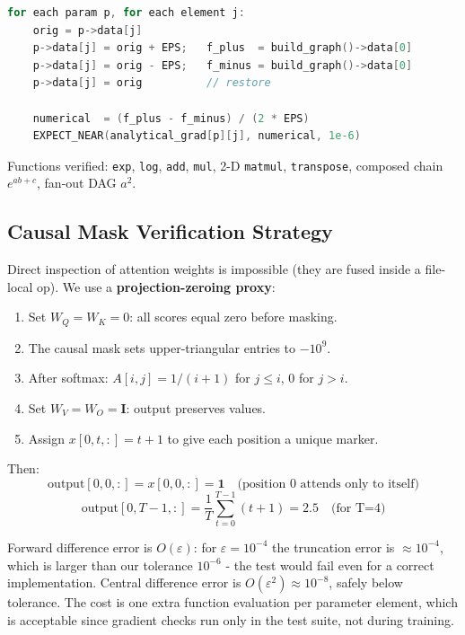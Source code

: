 \documentclass[12pt, a4paper]{article}
\begin{document}
\begin{tcolorbox}[codebox, title={check\_gradients - implementation sketch}]
\begin{lstlisting}[language=C++]
for each param p, for each element j:
    orig = p->data[j]
    p->data[j] = orig + EPS;   f_plus  = build_graph()->data[0]
    p->data[j] = orig - EPS;   f_minus = build_graph()->data[0]
    p->data[j] = orig          // restore

    numerical  = (f_plus - f_minus) / (2 * EPS)
    EXPECT_NEAR(analytical_grad[p][j], numerical, 1e-6)
\end{lstlisting}
\end{tcolorbox}

Functions verified: \texttt{exp}, \texttt{log}, \texttt{add}, \texttt{mul},
2-D \texttt{matmul}, \texttt{transpose}, composed chain $e^{ab+c}$, fan-out DAG $a^2$.

\subsection{Causal Mask Verification Strategy}

Direct inspection of attention weights is impossible (they are fused inside
a file-local op).  We use a \textbf{projection-zeroing proxy}:

\begin{enumerate}
  \item Set $W_Q = W_K = 0$: all scores equal zero before masking.
  \item The causal mask sets upper-triangular entries to $-10^9$.
  \item After softmax: $A[i,j] = 1/(i+1)$ for $j \leq i$, $0$ for $j > i$.
  \item Set $W_V = W_O = \mathbf{I}$: output preserves values.
  \item Assign $x[0,t,:] = t+1$ to give each position a unique marker.
\end{enumerate}

Then:
\[
  \text{output}[0, 0, :] = x[0, 0, :] = \mathbf{1}
  \quad\text{(position 0 attends only to itself)}
\]
\[
  \text{output}[0, T-1, :] = \frac{1}{T}\sum_{t=0}^{T-1}(t+1) = 2.5
  \quad\text{(for T=4)}
\]

\begin{tcolorbox}[interviewbox,
    title={Interview: Why central difference instead of forward difference?}]
  Forward difference error is $O(\varepsilon)$: for $\varepsilon = 10^{-4}$ the
  truncation error is $\approx 10^{-4}$, which is larger than our tolerance
  $10^{-6}$ - the test would fail even for a correct implementation.
  Central difference error is $O(\varepsilon^2) \approx 10^{-8}$, safely below
  tolerance.  The cost is one extra function evaluation per parameter element,
  which is acceptable since gradient checks run only in the test suite,
  not during training.
\end{tcolorbox}
\end{document}
